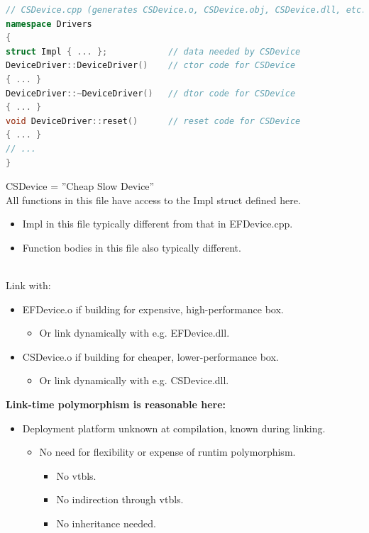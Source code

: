 \begin{lstlisting}[language=C++]
// CSDevice.cpp (generates CSDevice.o, CSDevice.obj, CSDevice.dll, etc.)
namespace Drivers
{
struct Impl { ... };            // data needed by CSDevice
DeviceDriver::DeviceDriver()    // ctor code for CSDevice
{ ... }
DeviceDriver::~DeviceDriver()   // dtor code for CSDevice
{ ... }
void DeviceDriver::reset()      // reset code for CSDevice
{ ... }
// ...
}
\end{lstlisting}
CSDevice = ''Cheap Slow Device''\\
All functions in this file have access to the Impl struct defined here.
\begin{itemize}
  \item Impl in this file typically different from that in EFDevice.cpp.
  \item Function bodies in this file also typically different.
\end{itemize}
\\
Link with:
\begin{itemize}
  \item EFDevice.o if building for expensive, high-performance box.
  \begin{itemize}
    \item Or link dynamically with e.g. EFDevice.dll.
  \end{itemize}
  \item CSDevice.o if building for cheaper, lower-performance box.
  \begin{itemize}
    \item Or link dynamically with e.g. CSDevice.dll.
  \end{itemize}
\end{itemize}
\textbf{Link-time polymorphism is reasonable here:}
\begin{itemize}
  \item Deployment platform unknown at compilation, known during linking.
  \begin{itemize}
    \item No need for flexibility or expense of runtim polymorphism.
    \begin{itemize}
      \item No vtbls.
      \item No indirection through vtbls.
      \item No inheritance needed.
    \end{itemize}
  \end{itemize}
\end{itemize}

